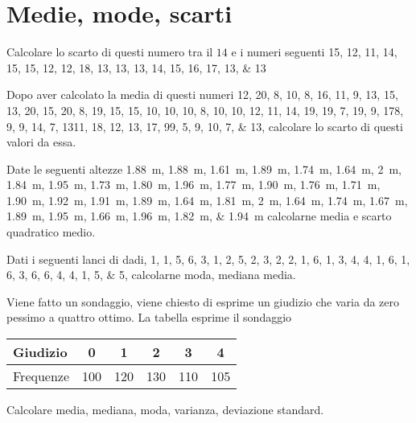 \section{Medie, mode, scarti}
\begin{esercizio}
	Calcolare lo scarto di questi numero tra il $14$ e i numeri seguenti \numlist{15; 12; 11; 14; 15; 15; 12; 12; 18; 13; 13; 13; 14; 15; 16; 17; 13; 13}
\end{esercizio}
\begin{esercizio}
	Dopo aver calcolato la media di questi numeri \numlist{12; 20; 8; 10; 8; 16; 11; 9; 13; 15; 13; 20; 15; 20; 8; 19; 15; 15; 10; 10; 10; 8;
		10; 10; 12; 11; 14; 19; 19; 7; 19; 9; 17 8; 9; 9; 14; 7; 13 11; 18; 12; 13; 17; 9 9; 5;
		9; 10; 7; 13}, calcolare lo scarto di questi valori da essa.
\end{esercizio}
\begin{esercizio}
	 Date le seguenti altezze \SIlist{1.88; 1.88; 1.61; 1.89; 1.74; 1.64; 2; 1.84; 1.95; 1.73; 1.80; 1.96; 1.77; 1.90; 1.76; 1.71; 1.90;
		1.92; 1.91; 1.89; 1.64; 1.81; 2; 1.64; 1.74; 1.67; 1.89; 1.95; 1.66; 1.96; 1.82; 1.94}{\m} calcolarne media e scarto quadratico medio.
\end{esercizio}
\begin{esercizio}
Dati i seguenti lanci di dadi, \numlist{1; 1; 5; 6; 3; 1; 2; 5; 2; 3; 2; 2; 1; 6; 1; 3; 4; 4; 1; 6; 1; 6; 3; 6; 6; 4; 4; 1; 5; 5}, calcolarne moda, mediana media.
\end{esercizio}
\begin{esercizio}
	
	\item Viene fatto un sondaggio, viene chiesto di esprime un giudizio che varia da zero pessimo a quattro  ottimo. La tabella esprime il sondaggio
	\begin{center}
		\begin{tabular}{l*{5} {S[table-format=3.0]}}
			{Giudizio}	&0  &1  &2  &3&4  \\
			\midrule 
			{Frequenze}	& 100 &120  & 130 & 110&105 \\ 
		\end{tabular}
	\end{center} Calcolare media, mediana, moda, varianza, deviazione standard.
\end{esercizio}


